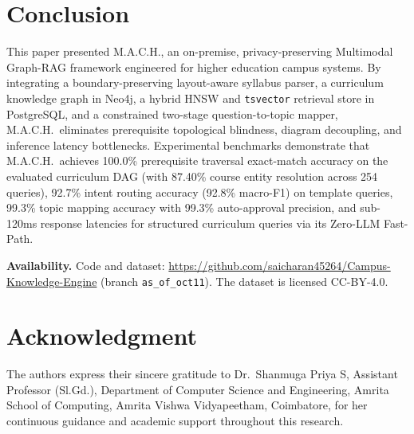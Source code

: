 \documentclass[conference]{IEEEtran}
\newcommand{\code}[1]{\texttt{\small #1}}
\begin{document}
\section{Conclusion}\label{sec:conclusion}
This paper presented M.A.C.H., an on-premise, privacy-preserving Multimodal Graph-RAG framework engineered for higher education campus systems. By integrating a boundary-preserving layout-aware syllabus parser, a curriculum knowledge graph in Neo4j, a hybrid HNSW and \code{tsvector} retrieval store in PostgreSQL, and a constrained two-stage question-to-topic mapper, M.A.C.H.\ eliminates prerequisite topological blindness, diagram decoupling, and inference latency bottlenecks. Experimental benchmarks demonstrate that M.A.C.H.\ achieves 100.0\% prerequisite traversal exact-match accuracy on the evaluated curriculum DAG (with 87.40\% course entity resolution across 254 queries), 92.7\% intent routing accuracy (92.8\% macro-F1) on template queries, 99.3\% topic mapping accuracy with 99.3\% auto-approval precision, and sub-120ms response latencies for structured curriculum queries via its Zero-LLM Fast-Path.

\textbf{Availability.} Code and dataset: \url{https://github.com/saicharan45264/Campus-Knowledge-Engine} (branch \code{as\_of\_oct11}). The dataset is licensed CC-BY-4.0.

\section*{Acknowledgment}
The authors express their sincere gratitude to Dr.~Shanmuga Priya S, Assistant Professor (Sl.Gd.), Department of Computer Science and Engineering, Amrita School of Computing, Amrita Vishwa Vidyapeetham, Coimbatore, for her continuous guidance and academic support throughout this research.



\end{document}
